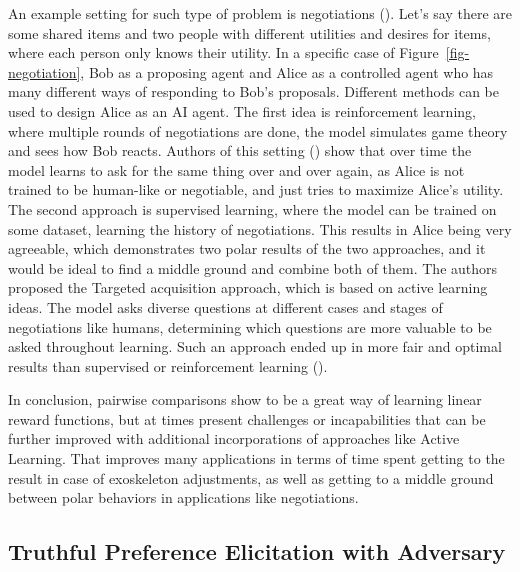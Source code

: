 \documentclass[
  letterpaper,
  numbers=noenddot,
  DIV=11]{scrreprt}
\theoremstyle{plain}
\theoremstyle{definition}
\theoremstyle{plain}
\theoremstyle{remark}
\begin{document}
An example setting for such type of problem is negotiations
(). Let's say there are
some shared items and two people with different utilities and desires
for items, where each person only knows their utility. In a specific
case of Figure~\ref{fig-negotiation}, Bob as a proposing agent and Alice
as a controlled agent who has many different ways of responding to Bob's
proposals. Different methods can be used to design Alice as an AI agent.
The first idea is reinforcement learning, where multiple rounds of
negotiations are done, the model simulates game theory and sees how Bob
reacts. Authors of this setting () show that over time the model learns to ask for the same
thing over and over again, as Alice is not trained to be human-like or
negotiable, and just tries to maximize Alice's utility. The second
approach is supervised learning, where the model can be trained on some
dataset, learning the history of negotiations. This results in Alice
being very agreeable, which demonstrates two polar results of the two
approaches, and it would be ideal to find a middle ground and combine
both of them. The authors proposed the Targeted acquisition approach,
which is based on active learning ideas. The model asks diverse
questions at different cases and stages of negotiations like humans,
determining which questions are more valuable to be asked throughout
learning. Such an approach ended up in more fair and optimal results
than supervised or reinforcement learning
().

In conclusion, pairwise comparisons show to be a great way of learning
linear reward functions, but at times present challenges or
incapabilities that can be further improved with additional
incorporations of approaches like Active Learning. That improves many
applications in terms of time spent getting to the result in case of
exoskeleton adjustments, as well as getting to a middle ground between
polar behaviors in applications like negotiations.

\subsection{Truthful Preference Elicitation with
Adversary}\label{truthful-preference-elicitation-with-adversary}
\end{document}
